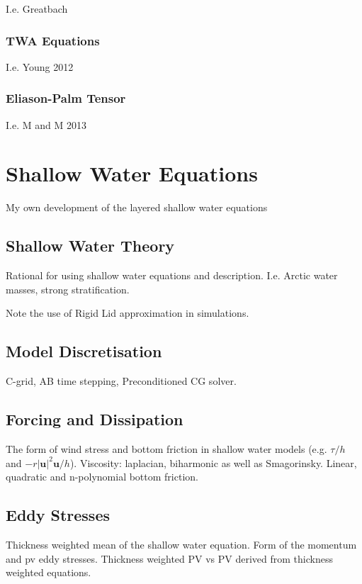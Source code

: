 \documentclass[10pt,a4paper]{article}
\begin{document}
I.e. Greatbach

\subsubsection{TWA Equations}

I.e. Young 2012

\subsubsection{Eliason-Palm Tensor}

I.e. M and M 2013

\section{Shallow Water Equations}

My own development of the layered shallow water equations

\subsection{Shallow Water Theory}

Rational for using shallow water equations and
description. I.e. Arctic water masses, 
strong stratification.

Note the use of Rigid Lid approximation in
simulations.

\subsection{Model Discretisation}

C-grid, AB time stepping, Preconditioned CG solver. 

\subsection{Forcing and Dissipation}

The form of wind stress and bottom friction in
shallow water models (e.g. $\tau/h$ and 
$-r\left|\boldsymbol{u}\right|^{2}\boldsymbol{u}/h$). Viscosity:
laplacian, biharmonic as well as Smagorinsky.
Linear, quadratic and n-polynomial bottom friction.

\subsection{Eddy Stresses}

Thickness weighted mean of the shallow water
equation. Form of the momentum and pv eddy stresses.
Thickness weighted PV vs PV derived from thickness 
weighted equations.
\end{document}

